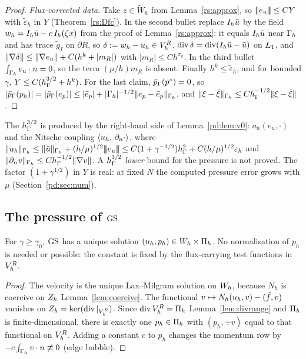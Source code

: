 \begin{proof}
\emph{Flux-corrected data.} Take $z\in\tilde W_h$ from Lemma~\ref{rs:approx}, so $|\!|\!|e_u|\!|\!|\le CY$ with $\tilde\varepsilon_h$ in $Y$ (Theorem~\ref{rs:Dfc}). In the second bullet replace $I_h\tilde u$ by the field $w_h=I_h\tilde u-c\,I_h(\zeta x)$ from the proof of Lemma~\ref{rs:approx}: it equals $I_h\tilde u$ near $\Gamma_h$ and has trace $\tilde g_I$ on $\partial R$, so $\delta:=w_h-u_h\in V_h^R$, $\operatorname{div}\delta=\operatorname{div}(I_h\tilde u-\tilde u)$ on $L_1$, and $\lVert \nabla\delta\rVert\le\lVert \nabla e_u\rVert+C(h^k+|m_R|)$ with $|m_R|\le Ch^{\sigma_k}$. In the third bullet $\int_{\Gamma_h}e_u\cdot n=0$, so the term $(\mu/h)m_R$ is absent. Finally $h^k\le\tilde\varepsilon_h$, and for bounded $\gamma$, $Y\le C(h_\Gamma^{3/2}+h^k)$. For the last claim, $\bar p_{\Gamma}(p^\circ)=0$, so $|\bar p_{\Gamma}(p_h)|=|\bar p_{\Gamma}(e_p)|\le|\bar e_p|+|\Gamma_h|^{-1/2}\lVert e_p-\bar e_p\rVert_{\Gamma_h}$, and $\lVert \xi-\bar\xi\rVert_{\Gamma_h}\le Ch_\Gamma^{-1/2}\lVert \xi-\bar\xi\rVert$.
\end{proof}

\begin{remark}\label{pd:rem:cnsp}
The $h_\Gamma^{3/2}$ is produced by the right-hand side of Lemma~\ref{pd:lem:v0}: $a_h(e_u,\cdot)$ and the Nitsche coupling $\langle u_h,\, \partial_n\cdot\rangle$, where $\lVert u_h\rVert_{\Gamma_h}\le\lVert \tilde u\rVert_{\Gamma_h}+(h/\mu)^{1/2}|\!|\!|e_u|\!|\!|\le C(1+\gamma^{-1/2})h_\Gamma^2+C(h/\mu)^{1/2}\varepsilon_h$ and $\lVert \partial_n v\rVert_{\Gamma_h}\le Ch_\Gamma^{-1/2}\lVert \nabla v\rVert$. A $h_\Gamma^{3/2}$ \emph{lower} bound for the pressure is not proved. The factor $(1+\gamma^{1/2})$ in $Y$ is real: at fixed $N$ the computed pressure error grows with $\mu$ (Section~\ref{pd:sec:num}).
\end{remark}

\subsection{The pressure of \texorpdfstring{$\mathrm{GS}$}{GS}}\label{pd:sec:gsp}

\begin{proposition}\label{pd:prop:gsunique}
For $\gamma\ge\gamma_0$, $\mathrm{GS}$ has a unique solution $(u_h,p_h)\in W_h\times\Pi_h$. No normalisation of $p_h$ is needed or possible: the constant is fixed by the flux-carrying test functions in $V_h^R$.
\end{proposition}

\begin{proof}
The velocity is the unique Lax--Milgram solution on $W_h$, because $N_h$ is coercive on $Z_h$ Lemma~\ref{lem:coercive}. The functional $v\mapsto N_h(u_h,v)-(\tilde f,v)$ vanishes on $Z_h=\ker(\operatorname{div}|_{V_h^R})$. Since $\operatorname{div}V_h^R=\Pi_h$ Lemma~\ref{lem:divrange} and $\Pi_h$ is finite-dimensional, there is exactly one $p_h\in\Pi_h$ with $(p_h,\div v)$ equal to that functional on $V_h^R$. Adding a constant $c$ to $p_h$ changes the momentum row by $-c\int_{\Gamma_h}v\cdot n\not\equiv0$ (edge bubble).
\end{proof}

